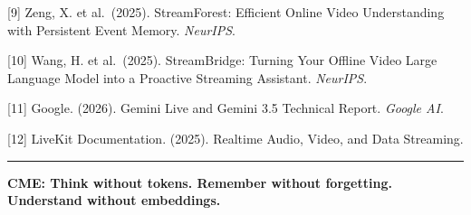 \documentclass[
  11pt,
  a4paper,
]{article}
\begin{document}
{[}9{]} Zeng, X. et al.~(2025). StreamForest: Efficient Online Video
Understanding with Persistent Event Memory. \emph{NeurIPS}.

{[}10{]} Wang, H. et al.~(2025). StreamBridge: Turning Your Offline
Video Large Language Model into a Proactive Streaming Assistant.
\emph{NeurIPS}.

{[}11{]} Google. (2026). Gemini Live and Gemini 3.5 Technical Report.
\emph{Google AI}.

{[}12{]} LiveKit Documentation. (2025). Realtime Audio, Video, and Data
Streaming.

\begin{center}\rule{0.5\linewidth}{0.5pt}\end{center}

\textbf{CME: Think without tokens. Remember without forgetting.
Understand without embeddings.}
\end{document}

